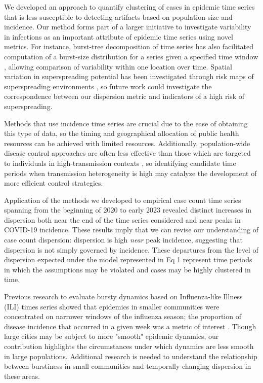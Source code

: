 \documentclass[10pt,letterpaper]{article}
\begin{document}
We developed an approach to quantify clustering of cases in epidemic time series that is less susceptible to detecting artifacts based on population size and incidence. 
Our method forms part of a larger initiative to investigate variability in infections as an important attribute of epidemic time series using novel metrics.
For instance, burst-tree decomposition of time series has also facilitated computation of a burst-size distribution for a series given a specified time window \cite{jo_burst-tree_2020}, allowing comparison of variability within one location over time. 
Spatial variation in superspreading potential has been investigated through risk maps of superspreading environments \cite{loo_identification_2021}, so future work could investigate the correspondence between our dispersion metric and indicators of a high risk of superspreading.

Methods that use incidence time series are crucial due to the ease of obtaining this type of data, so the timing and geographical allocation of public health resources can be achieved with limited resources. 
Additionally, population-wide disease control approaches are often less effective than those which are targeted to individuals in high-transmission contexts \cite{lloyd-smith_superspreading_2005}, so identifying candidate time periods when transmission heterogeneity is high may catalyze the development of more efficient control strategies.

Application of the methods we developed to empirical case count time series spanning from the beginning of 2020 to early 2023 revealed distinct increases in dispersion both near the end of the time series considered and near peaks in COVID-19 incidence.
These results imply that we can revise our understanding of case count dispersion: dispersion is high \emph{near} peak incidence, suggesting that dispersion is not simply governed by incidence. 
These departures from the level of dispersion expected under the model represented in Eq 1 represent time periods in which the assumptions may be violated and cases may be highly clustered in time.

Previous research to evaluate bursty dynamics based on Influenza-like Illness (ILI) times series showed that epidemics in smaller communities were concentrated on narrower windows of the influenza season; the proportion of disease incidence that occurred in a given week was a metric of interest \cite{dalziel_urbanization_2018}. 
Though large cities may be subject to more "smooth" epidemic dynamics, our contribution highlights the circumstances under which dynamics are less smooth in large populations.
Additional research is needed to understand the relationship between burstiness in small communities and temporally changing dispersion in these areas.
\end{document}
